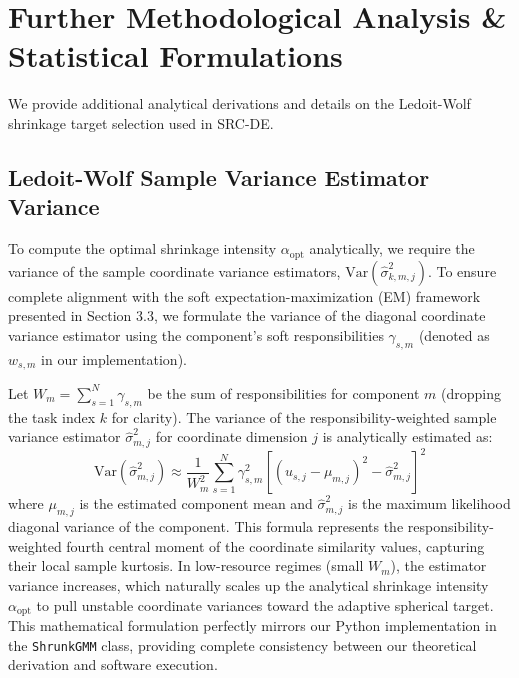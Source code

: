 \documentclass{article}
\theoremstyle{plain}
\theoremstyle{definition}
\theoremstyle{remark}
\begin{document}










\newpage
\appendix
\onecolumn
\section{Further Methodological Analysis \& Statistical Formulations}\label{sec:appendix_formulas}

We provide additional analytical derivations and details on the Ledoit-Wolf shrinkage target selection used in SRC-DE.

\subsection{Ledoit-Wolf Sample Variance Estimator Variance}
To compute the optimal shrinkage intensity $\alpha_{\text{opt}}$ analytically, we require the variance of the sample coordinate variance estimators, $\text{Var}(\hat{\sigma}^2_{k, m, j})$. To ensure complete alignment with the soft expectation-maximization (EM) framework presented in Section 3.3, we formulate the variance of the diagonal coordinate variance estimator using the component's soft responsibilities $\gamma_{s, m}$ (denoted as $w_{s, m}$ in our implementation). 

Let $W_m = \sum_{s=1}^N \gamma_{s, m}$ be the sum of responsibilities for component $m$ (dropping the task index $k$ for clarity). The variance of the responsibility-weighted sample variance estimator $\hat{\sigma}^2_{m, j}$ for coordinate dimension $j$ is analytically estimated as:
\begin{equation}
\label{eq:var_of_var_est}
    \text{Var}(\hat{\sigma}^2_{m, j}) \approx \frac{1}{W_m^2} \sum_{s=1}^N \gamma_{s, m}^2 \left[ (u_{s, j} - \mu_{m, j})^2 - \hat{\sigma}^2_{m, j} \right]^2
\end{equation}
where $\mu_{m, j}$ is the estimated component mean and $\hat{\sigma}^2_{m, j}$ is the maximum likelihood diagonal variance of the component. This formula represents the responsibility-weighted fourth central moment of the coordinate similarity values, capturing their local sample kurtosis. In low-resource regimes (small $W_m$), the estimator variance increases, which naturally scales up the analytical shrinkage intensity $\alpha_{\text{opt}}$ to pull unstable coordinate variances toward the adaptive spherical target. This mathematical formulation perfectly mirrors our Python implementation in the \texttt{ShrunkGMM} class, providing complete consistency between our theoretical derivation and software execution.
\end{document}
